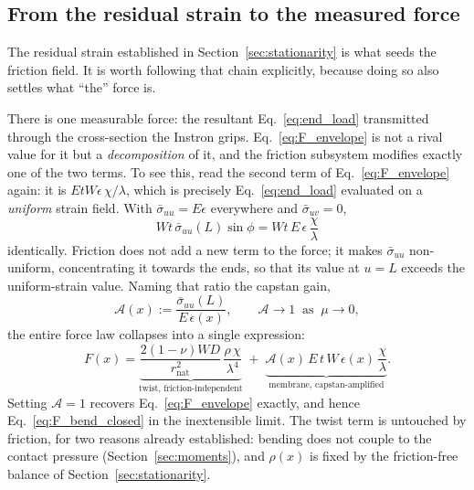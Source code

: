 \documentclass[11pt]{article}
\begin{document}
\subsection{From the residual strain to the measured force}
\label{sec:force_chain}
The residual strain established in Section~\ref{sec:stationarity} is what seeds
the friction field. It is worth following that chain explicitly, because doing so
also settles what ``the'' force is.

There is one measurable force: the resultant Eq.~\eqref{eq:end_load} transmitted
through the cross-section the Instron grips. Eq.~\eqref{eq:F_envelope} is not a
rival value for it but a \emph{decomposition} of it, and the friction subsystem
modifies exactly one of the two terms. To see this, read the second term of
Eq.~\eqref{eq:F_envelope} again: it is $E t W \epsilon\,\chi/\lambda$, which is
precisely Eq.~\eqref{eq:end_load} evaluated on a \emph{uniform} strain field.
With $\bar\sigma_{uu} = E\epsilon$ everywhere and $\bar\sigma_{uv} = 0$,
\begin{equation}\label{eq:end_load_uniform}
    W t\,\bar\sigma_{uu}(L)\sin\phi
      = W t\,E\,\epsilon\,\frac{\chi}{\lambda}
\end{equation}
identically. Friction does not add a new term to the force; it makes
$\bar\sigma_{uu}$ non-uniform, concentrating it towards the ends, so that its
value at $u = L$ exceeds the uniform-strain value. Naming that ratio the capstan
gain,
\begin{equation}\label{eq:gain}
    \boxed{\;\mathcal{A}(x) := \frac{\bar\sigma_{uu}(L)}{E\,\epsilon(x)},
    \qquad \mathcal{A} \to 1 \ \text{ as } \ \mu \to 0,\;}
\end{equation}
the entire force law collapses into a single expression:
\begin{equation}\label{eq:F_total}
    \boxed{\;F(x) =
      \underbrace{\frac{2\left(1-\nu\right)W D}{r_{\mathrm{nat}}^{2}}\,
        \frac{\rho\,\chi}{\lambda^{4}}}_{\text{twist, friction-independent}}
      \;+\;
      \underbrace{\mathcal{A}(x)\,E\,t\,W\,\epsilon(x)\,\frac{\chi}{\lambda}}
        _{\text{membrane, capstan-amplified}}.\;}
\end{equation}
Setting $\mathcal{A} = 1$ recovers Eq.~\eqref{eq:F_envelope} exactly, and hence
Eq.~\eqref{eq:F_bend_closed} in the inextensible limit. The twist term is
untouched by friction, for two reasons already established: bending does not
couple to the contact pressure (Section~\ref{sec:moments}), and $\rho(x)$ is
fixed by the friction-free balance of Section~\ref{sec:stationarity}.
\end{document}
